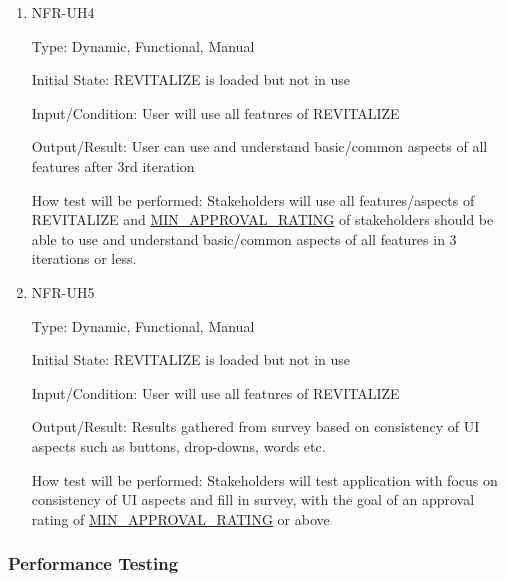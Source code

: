 \documentclass[12pt, titlepage]{article}
\begin{document}
\begin{enumerate}
	\item{NFR-UH4\\}
	
	Type: Dynamic, Functional, Manual
	
	Initial State: REVITALIZE is loaded but not in use
	
	Input/Condition: User will use all features of REVITALIZE
	
	Output/Result: User can use and understand basic/common aspects of all features after 3rd iteration
	
	How test will be performed: Stakeholders will use all features/aspects of REVITALIZE and \hyperlink{MIN_APPROVAL_RATING}{MIN\_APPROVAL\_RATING} of stakeholders should be able to use and understand basic/common aspects of all features in 3 iterations or less.
	
	\item{NFR-UH5\\}
	
	Type: Dynamic, Functional, Manual
	
	Initial State: REVITALIZE is loaded but not in use
	
	Input/Condition: User will use all features of REVITALIZE
	
	Output/Result: Results gathered from survey based on consistency of UI aspects such as buttons, drop-downs, words etc.
	
	How test will be performed: Stakeholders will test application with focus on consistency of UI aspects and fill in survey, with the goal of an approval rating of \hyperlink{MIN_APPROVAL_RATING}{MIN\_APPROVAL\_RATING} or above
	
\end{enumerate}

\subsubsection{Performance Testing}
\end{document}
